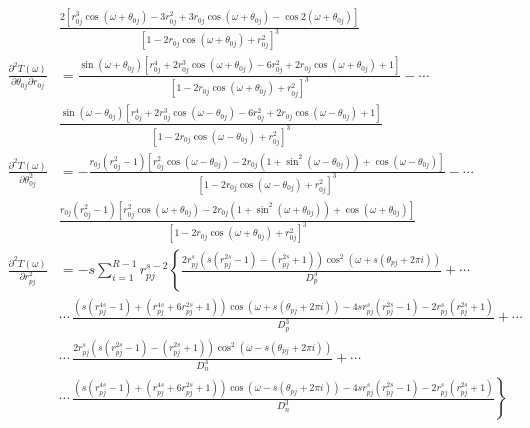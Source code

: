 \documentclass[a4paper,twoside,10pt,english]{report}
\begin{document}
\begin{raggedbottom}
\begin{align*}
 & \frac{2\left[r_{0j}^{3}\cos\left(\omega+\theta_{0j}\right)-3r_{0j}^{2}+3r_{0j}\cos\left(\omega+\theta_{0j}\right)-\cos2\left(\omega+\theta_{0j}\right)\right]}{\left[1-2r_{0j}\cos\left(\omega+\theta_{0j}\right)+r_{0j}^{2}\right]^{3}}\\
\frac{\partial^{2}T\left(\omega\right)}{\partial\theta_{0j}\partial r_{0j}} &= \frac{\sin\left(\omega+\theta_{0j}\right)\left[r_{0j}^{4}+2r_{0j}^{3}\cos\left(\omega+\theta_{0j}\right)-6r_{0j}^{2}+2r_{0j}\cos\left(\omega+\theta_{0j}\right)+1\right]}{\left[1-2r_{0j}\cos\left(\omega+\theta_{0j}\right)+r_{0j}^{2}\right]^{3}}-\cdots\\
 & \frac{\sin\left(\omega-\theta_{0j}\right)\left[r_{0j}^{4}+2r_{0j}^{3}\cos\left(\omega-\theta_{0j}\right)-6r_{0j}^{2}+2r_{0j}\cos\left(\omega-\theta_{0j}\right)+1\right]}{\left[1-2r_{0j}\cos\left(\omega-\theta_{0j}\right)+r_{0j}^{2}\right]^{3}}\\
\frac{\partial^{2}T\left(\omega\right)}{\partial\theta_{0j}^{2}} &= -\frac{r_{0j}\left(r_{0j}^{2}-1\right)\left[r_{0j}^{2}\cos\left(\omega-\theta_{0j}\right)-2r_{0j}\left(1+\sin^{2}\left(\omega-\theta_{0j}\right)\right)+\cos\left(\omega-\theta_{0j}\right)\right]}{\left[1-2r_{0j}\cos\left(\omega-\theta_{0j}\right)+r_{0j}^{2}\right]^{3}}-\cdots\\
 & \frac{r_{0j}\left(r_{0j}^{2}-1\right)\left[r_{0j}^{2}\cos\left(\omega+\theta_{0j}\right)-2r_{0j}\left(1+\sin^{2}\left(\omega+\theta_{0j}\right)\right)+\cos\left(\omega+\theta_{0j}\right)\right]}{\left[1-2r_{0j}\cos\left(\omega+\theta_{0j}\right)+r_{0j}^{2}\right]^{3}}\\
\frac{\partial^{2}T\left(\omega\right)}{\partial r_{pj}^{2}} &= -s\sum_{i=1}^{R-1}r_{pj}^{s-2}\left\{ \frac{2r_{pj}^{s}\left(s\left(r_{pj}^{2s}-1\right)-\left(r_{pj}^{2s}+1\right)\right)\cos^{2}\left(\omega+s\left(\theta_{pj}+2\pi i\right)\right)}{D_{p}^{3}}+\cdots\right.\\
 & \left.\cdots\,\frac{\left(s\left(r_{pj}^{4s}-1\right)+\left(r_{pj}^{4s}+6r_{pj}^{2s}+1\right)\right)\cos\left(\omega+s\left(\theta_{pj}+2\pi i\right)\right)-4sr_{pj}^{s}\left(r_{pj}^{2s}-1\right)-2r_{pj}^{s}\left(r_{pj}^{2s}+1\right)}{D_{p}^{3}}+\cdots\right.\\
 & \left.\cdots\,\frac{2r_{pj}^{s}\left(s\left(r_{pj}^{2s}-1\right)-\left(r_{pj}^{2s}+1\right)\right)\cos^{2}\left(\omega-s\left(\theta_{pj}+2\pi i\right)\right)}{D_{n}^{3}}+\cdots\right.\\
 & \left.\cdots\,\frac{\left(s\left(r_{pj}^{4s}-1\right)+\left(r_{pj}^{4s}+6r_{pj}^{2s}+1\right)\right)\cos\left(\omega-s\left(\theta_{pj}+2\pi i\right)\right)-4sr_{pj}^{s}\left(r_{pj}^{2s}-1\right)-2r_{pj}^{s}\left(r_{pj}^{2s}+1\right)}{D_{n}^{3}}\right\} \\

\end{align*}
\end{raggedbottom}
\end{document}
